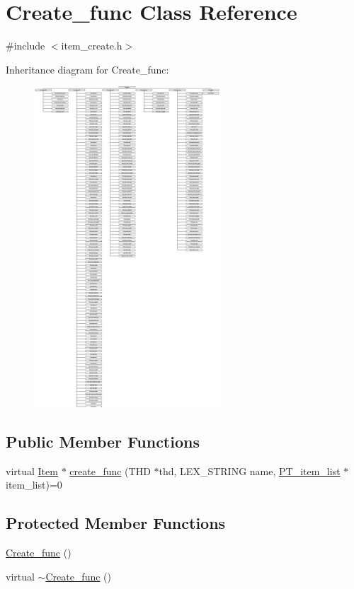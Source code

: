 \hypertarget{classCreate__func}{}\section{Create\+\_\+func Class Reference}
\label{classCreate__func}


{\ttfamily \#include $<$item\+\_\+create.\+h$>$}

Inheritance diagram for Create\+\_\+func\+:\begin{figure}[H]
\begin{center}
\leavevmode
\includegraphics[height=12.000000cm]{classCreate__func}
\end{center}
\end{figure}
\subsection*{Public Member Functions}
\begin{DoxyCompactItemize}
\item 
virtual \mbox{\hyperlink{classItem}{Item}} $\ast$ \mbox{\hyperlink{classCreate__func_a04aa802c4546f72d1c10db1983cece5b}{create\+\_\+func}} (T\+HD $\ast$thd, L\+E\+X\+\_\+\+S\+T\+R\+I\+NG name, \mbox{\hyperlink{classPT__item__list}{P\+T\+\_\+item\+\_\+list}} $\ast$item\+\_\+list)=0
\end{DoxyCompactItemize}
\subsection*{Protected Member Functions}
\begin{DoxyCompactItemize}
\item 
\mbox{\hyperlink{classCreate__func_ac010933937e5d5bb116bdf948f5ba48e}{Create\+\_\+func}} ()
\item 
virtual \mbox{\hyperlink{classCreate__func_a5d42932df08fda80ffe9d5ee275f4bdf}{$\sim$\+Create\+\_\+func}} ()
\end{DoxyCompactItemize}


